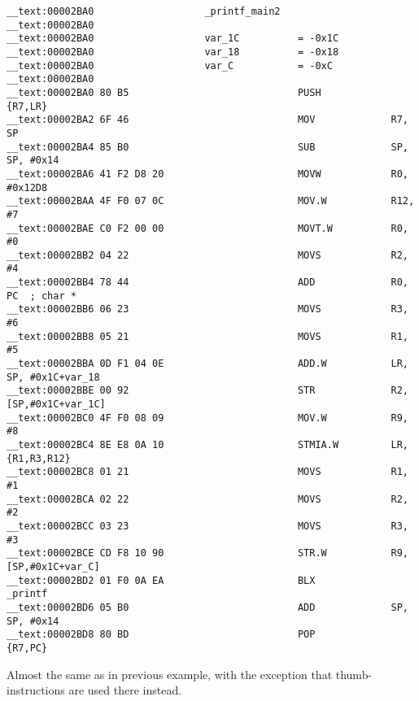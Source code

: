 \begin{lstlisting}
__text:00002BA0                   _printf_main2
__text:00002BA0
__text:00002BA0                   var_1C          = -0x1C
__text:00002BA0                   var_18          = -0x18
__text:00002BA0                   var_C           = -0xC
__text:00002BA0
__text:00002BA0 80 B5                             PUSH            {R7,LR}
__text:00002BA2 6F 46                             MOV             R7, SP
__text:00002BA4 85 B0                             SUB             SP, SP, #0x14
__text:00002BA6 41 F2 D8 20                       MOVW            R0, #0x12D8
__text:00002BAA 4F F0 07 0C                       MOV.W           R12, #7
__text:00002BAE C0 F2 00 00                       MOVT.W          R0, #0
__text:00002BB2 04 22                             MOVS            R2, #4
__text:00002BB4 78 44                             ADD             R0, PC  ; char *
__text:00002BB6 06 23                             MOVS            R3, #6
__text:00002BB8 05 21                             MOVS            R1, #5
__text:00002BBA 0D F1 04 0E                       ADD.W           LR, SP, #0x1C+var_18
__text:00002BBE 00 92                             STR             R2, [SP,#0x1C+var_1C]
__text:00002BC0 4F F0 08 09                       MOV.W           R9, #8
__text:00002BC4 8E E8 0A 10                       STMIA.W         LR, {R1,R3,R12}
__text:00002BC8 01 21                             MOVS            R1, #1
__text:00002BCA 02 22                             MOVS            R2, #2
__text:00002BCC 03 23                             MOVS            R3, #3
__text:00002BCE CD F8 10 90                       STR.W           R9, [SP,#0x1C+var_C]
__text:00002BD2 01 F0 0A EA                       BLX             _printf
__text:00002BD6 05 B0                             ADD             SP, SP, #0x14
__text:00002BD8 80 BD                             POP             {R7,PC}
\end{lstlisting}

{Almost the same as in previous example, with the exception that thumb-instructions are used there instead}.

